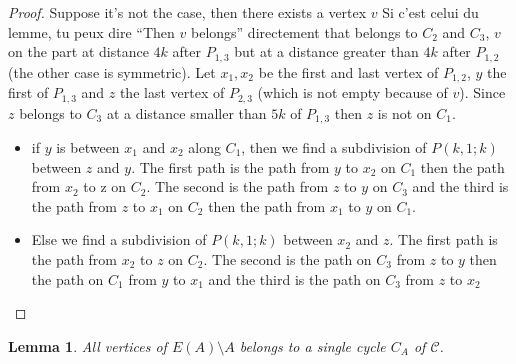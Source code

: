 \documentclass[utf8,10pt]{article}
\theoremstyle{plain}
\newtheorem{lemma}[theorem]{Lemma}
\theoremstyle{definition}
\theoremstyle{remark}
\newcommand{\nathann}[1]{{\color{blue}{\bf Nathann:} #1}}
\begin{document}
\begin{proof}
Suppose it's not the case, then there exists a vertex $v$ \nathann{Si c'est celui du lemme, tu peux dire ``Then $v$ belongs'' directement} that belongs to $C_2$ and $C_3$, $v$ on the part at distance $4k$ after $P_{1,3}$
but at a distance greater than $4k$ after $P_{1,2}$ (the other case is symmetric).
Let $x_1, x_2$ be the first and last vertex of $P_{1,2}$, $y$ the first of $P_{1,3}$ and $z$ the last vertex of $P_{2,3}$
(which is not empty because of $v$). Since $z$ belongs to $C_3$ at a distance smaller than $5k$ of $P_{1,3}$
then $z$ is not on $C_1$.
\begin{itemize}
	\item if $y$ is between $x_1$ and $x_2$ along $C_1$, then we find a subdivision of $P(k,1;k)$
	between $z$ and $y$. The first path is the path from $y$ to $x_2$ on $C_1$ then the path from
	$x_2$ to z on $C_2$. The second is the path from $z$ to $y$ on $C_3$ and the third is the path
	from $z$ to $x_1$ on $C_2$ then the path from $x_1$ to $y$ on $C_1$.
	\item Else we find a subdivision of $P(k,1;k)$ between $x_2$ and $z$. The first path is the path from $x_2$
	to $z$ on $C_2$. The second is the path on $C_3$ from $z$ to $y$ then the path on $C_1$ from $y$ to $x_1$
	and the third is the path on $C_3$ from $z$ to $x_2$

\end{itemize}

\end{proof}


\begin{lemma}\label{A}
All vertices of $E(A) \setminus A$ belongs to a single cycle $C_A$ of $\mathcal{C}$.
\end{lemma}
\end{document}
